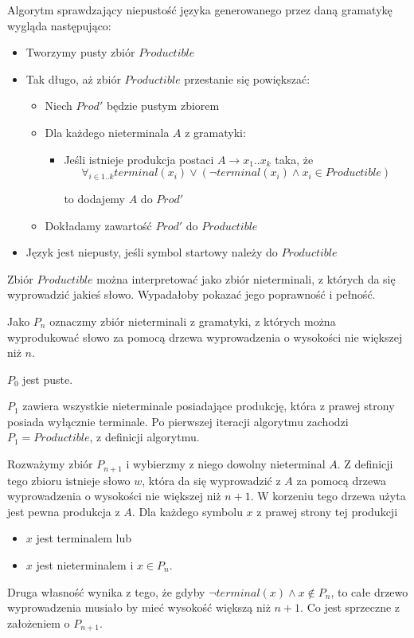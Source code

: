 \documentclass[a4paper,11pt]{article}
\begin{document}
Algorytm sprawdzający niepustość języka generowanego przez daną gramatykę
wygląda następująco:

\begin{itemize}
  \item{Tworzymy pusty zbiór $Productible$}
  \item{Tak długo, aż zbiór $Productible$ przestanie się powiększać:
    \begin{itemize}
      \item{Niech $Prod'$ będzie pustym zbiorem}
      \item{Dla każdego nieterminala $A$ z gramatyki:
        \begin{itemize}
          \item{Jeśli istnieje produkcja postaci $A \rightarrow x_{1} .. x_{k}$
                taka, że
\begin{displaymath}
  \forall_{i \in {1..k}} terminal(x_{i}) \vee (\neg terminal(x_{i}) \wedge x_{i} \in Productible)
\end{displaymath}

            to dodajemy $A$ do $Prod'$}
        \end{itemize}
      }
      \item{Dokładamy zawartość $Prod'$ do $Productible$}
    \end{itemize}
  }
  \item{Język jest niepusty, jeśli symbol startowy należy do $Productible$}
\end{itemize}


Zbiór $Productible$ można interpretować jako zbiór nieterminali, z których da
się wyprowadzić jakieś słowo. Wypadałoby pokazać jego poprawność i pełność.

Jako $P_{n}$ oznaczmy zbiór nieterminali z gramatyki, z których można
wyprodukować słowo za pomocą drzewa wyprowadzenia o wysokości nie większej niż
$n$.

$P_{0}$ jest puste.

$P_{1}$ zawiera wszystkie nieterminale posiadające produkcję, która z
prawej strony posiada wyłącznie terminale. Po pierwszej iteracji algorytmu
zachodzi $P_{1} = Productible$, z definicji algorytmu.

Rozważymy zbiór $P_{n+1}$ i wybierzmy z niego dowolny nieterminal $A$. Z
definicji tego zbioru istnieje słowo $w$, która da się wyprowadzić z $A$ za
pomocą drzewa wyprowadzenia o wysokości nie większej niż $n+1$. W korzeniu tego
drzewa użyta jest pewna produkcja z $A$. Dla każdego symbolu $x$ z prawej strony
tej produkcji
\begin{itemize}
  \item{$x$ jest terminalem lub}
  \item{$x$ jest nieterminalem i $x \in P_{n}$.}
\end{itemize}
Druga własność wynika z tego, że gdyby $\neg terminal(x) \wedge x \notin P_{n}$,
to całe drzewo wyprowadzenia musiało by mieć wysokość większą niż $n+1$. Co jest
sprzeczne z założeniem o $P_{n+1}$.
\end{document}
